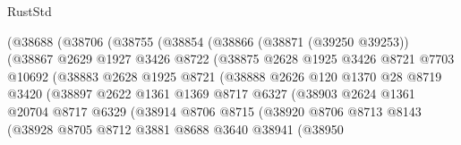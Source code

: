 \begin{lexlean}{RustStd}
\begin{coremodule}
                      (@38688
                        (@38706
                          (@38755
                            (@38854
                              (@38866
                                (@38871 (@39250 @39253))
                                (@38867
                                  @2629
                                  @1927
                                  @3426
                                  @8722
                                  (@38875
                                    @2628
                                    @1925
                                    @3426
                                    @8721
                                    @7703
                                    @10692
                                    (@38883
                                      @2628
                                      @1925
                                      @8721
                                      (@38888
                                        @2626
                                        @120
                                        @1370
                                        @28
                                        @8719
                                        @3420
                                        (@38897
                                          @2622
                                          @1361
                                          @1369
                                          @8717
                                          @6327
                                          (@38903
                                            @2624
                                            @1361
                                            @20704
                                            @8717
                                            @6329
                                            (@38914
                                              @8706
                                              @8715
                                              (@38920
                                                @8706
                                                @8713
                                                @8143
                                                (@38928
                                                  @8705
                                                  @8712
                                                  @3881
                                                  @8688
                                                  @3640
                                                  @38941
                                                  (@38950

\end{coremodule}
\end{lexlean}
